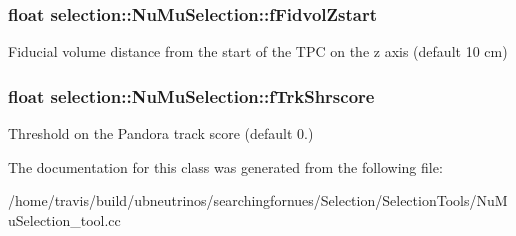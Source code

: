 \subsubsection[{\texorpdfstring{f\+Fidvol\+Zstart}{fFidvolZstart}}]{\setlength{\rightskip}{0pt plus 5cm}float selection\+::\+Nu\+Mu\+Selection\+::f\+Fidvol\+Zstart\hspace{0.3cm}{\ttfamily [private]}}\hypertarget{classselection_1_1NuMuSelection_afd0602fc9b69392ffb8dbc36c6ff3e61}{}\label{classselection_1_1NuMuSelection_afd0602fc9b69392ffb8dbc36c6ff3e61}
Fiducial volume distance from the start of the T\+PC on the z axis (default 10 cm) 
\subsubsection[{\texorpdfstring{f\+Trk\+Shrscore}{fTrkShrscore}}]{\setlength{\rightskip}{0pt plus 5cm}float selection\+::\+Nu\+Mu\+Selection\+::f\+Trk\+Shrscore\hspace{0.3cm}{\ttfamily [private]}}\hypertarget{classselection_1_1NuMuSelection_ad112dbbc5a443a1ff5408c512788a154}{}\label{classselection_1_1NuMuSelection_ad112dbbc5a443a1ff5408c512788a154}
Threshold on the Pandora track score (default 0.) 

The documentation for this class was generated from the following file\+:\begin{DoxyCompactItemize}
\item 
/home/travis/build/ubneutrinos/searchingfornues/\+Selection/\+Selection\+Tools/Nu\+Mu\+Selection\+\_\+tool.\+cc\end{DoxyCompactItemize}
